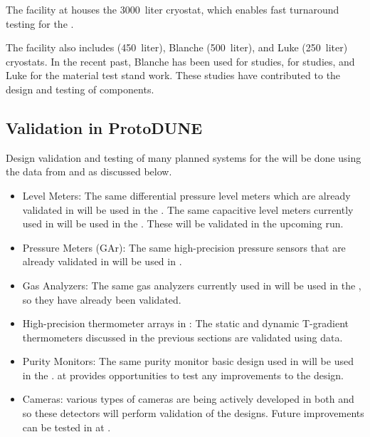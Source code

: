 The  facility at  houses the  \SI {3000} {liter} cryostat, which enables fast turnaround testing for the  . 

The  facility also includes   (\SI {450} {liter}), Blanche (\SI {500} {liter}), and Luke (\SI {250} {liter}) cryostats. %
In the recent past, Blanche has been used for  studies,   for  studies, and Luke for the material test stand work. These studies have contributed to the design and testing of   components.

\subsection{Validation in ProtoDUNE}
\label{sec:pdsp-cryo-valid}

Design validation and testing of many planned  systems for
the  will be done using the data from
 and  as discussed below.

\begin{itemize}
	\item Level Meters: The same differential pressure level meters
	      which are already validated in  will be used in the . The same capacitive level meters currently used in
	       will be used in the . These will be
	      validated in the upcoming  run.
	      
	\item Pressure Meters (GAr): The same high-precision pressure sensors that are already validated in  will be used in  .
	
	\item Gas Analyzers: The same gas analyzers currently used in
	       will be used in the , so they have already
	      been validated.
	      
	\item High-precision thermometer arrays in : The static
	      and dynamic T-gradient thermometers discussed in the previous sections are validated using  data.
	      
	\item Purity Monitors: The same purity monitor basic design used in  will be used in the .  at  provides opportunities to
	      test any improvements to the design.
	\item Cameras: various types of cameras are being actively
	      developed in both  and  so these detectors will perform validation of the 
	      designs. Future
	      improvements can be tested in  at . %
\end{itemize}


